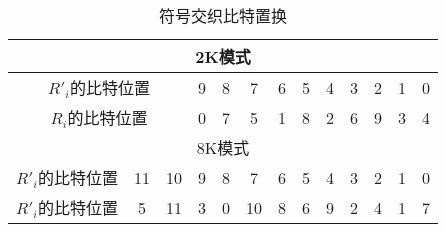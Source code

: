 \begin{table}[!hbp]
	\centering
	\caption{符号交织比特置换}
	\begin{tabular}{|c|c|c|c|c|c|c|c|c|c|c|c|c|}
	\hline\hline
	\multicolumn{13}{|c|}{2K模式} \\
	\hline
	\multicolumn{3}{|c|}{$R'_i$的比特位置} & 9 & 8 & 7 & 6 & 5 & 4 & 3 & 2 & 1 & 0 \\
	\hline
	\multicolumn{3}{|c|}{$R_i$的比特位置} & 0 & 7 & 5 & 1 & 8 & 2 & 6 & 9 & 3 & 4 \\
	\hline
	\multicolumn{13}{|c|}{8K模式} \\
	\hline
	$R'_i$的比特位置 & 11 & 10 & 9 & 8 & 7 & 6 & 5 & 4 & 3 & 2 & 1 & 0 \\
	\hline
	$R'_i$的比特位置 & 5 & 11 & 3 & 0 & 10 & 8 & 6 & 9 & 2 & 4 & 1 & 7 \\
	\hline\hline
	\end{tabular}
	\label{table:symbol_interleaver_bit_replace}
\end{table}

\endinput